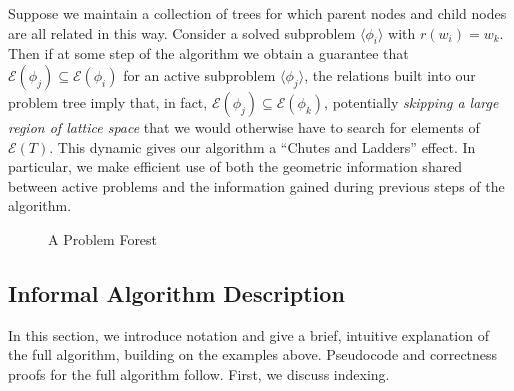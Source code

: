 \documentclass[11pt,reqno]{amsart}
\theoremstyle{definition}
\numberwithin{equation}{section}
\newcommand{\lag}{\langle}
\newcommand{\rag}{\rangle}
\newcommand{\pre}{\phi}
\newcommand{\sub}{\subseteq}
\newcommand{\fix}{\mathcal{E}}
\begin{document}
Suppose we maintain a collection of trees for which parent nodes and child nodes are all related in this way. 
Consider a solved subproblem $\lag \pre_i \rag$ with $r(w_i) = w_k$.
Then if at some step of the algorithm we obtain a guarantee that $\fix(\pre_j) \sub \fix(\pre_i)$ for an active subproblem $\lag \pre_j \rag$, the relations built into our problem tree imply that, in fact, $\fix(\pre_j) \sub \fix(\pre_k)$, potentially \emph{skipping a large region of lattice space} that we would otherwise have to search for elements of $\fix(T)$. 
This dynamic gives our algorithm a ``Chutes and Ladders'' effect. 
In particular, we make efficient use of both the geometric information shared between active problems and the information gained during previous steps of the algorithm. 

\begin{figure} \label{fig:forest} 
\caption{A Problem Forest}
\end{figure}

\subsection{Informal Algorithm Description} 

In this section, we introduce notation and give a brief, intuitive explanation of the full algorithm, building on the examples above.
Pseudocode and correctness proofs for the full algorithm follow. 
First, we discuss indexing. 
\end{document}
